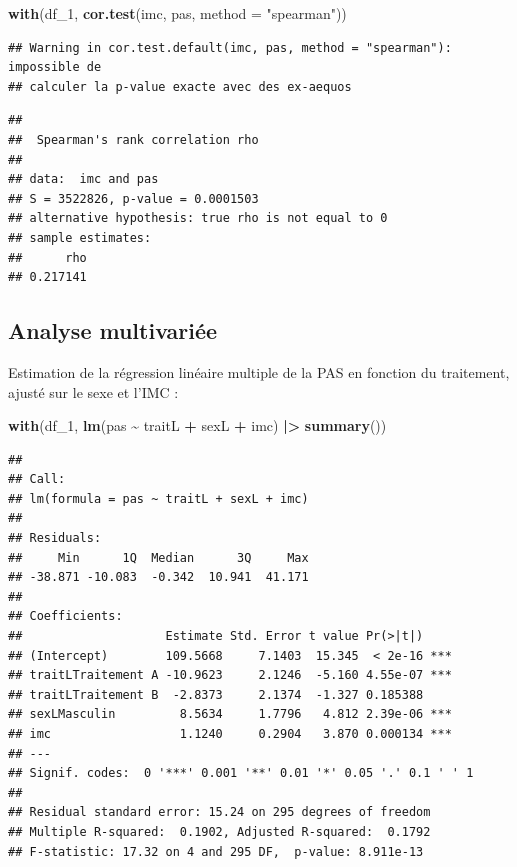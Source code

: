 \documentclass[
]{book}
\newenvironment{Shaded}{\begin{snugshade}}{\end{snugshade}}
\newcommand{\AttributeTok}[1]{\textcolor[rgb]{0.13,0.29,0.53}{#1}}
\newcommand{\FunctionTok}[1]{\textcolor[rgb]{0.13,0.29,0.53}{\textbf{#1}}}
\newcommand{\NormalTok}[1]{#1}
\newcommand{\SpecialCharTok}[1]{\textcolor[rgb]{0.81,0.36,0.00}{\textbf{#1}}}
\newcommand{\StringTok}[1]{\textcolor[rgb]{0.31,0.60,0.02}{#1}}
\begin{document}
\begin{Shaded}
\begin{Highlighting}[]
\FunctionTok{with}\NormalTok{(df\_1,}
     \FunctionTok{cor.test}\NormalTok{(imc, pas, }\AttributeTok{method =} \StringTok{"spearman"}\NormalTok{))}
\end{Highlighting}
\end{Shaded}

\begin{verbatim}
## Warning in cor.test.default(imc, pas, method = "spearman"): impossible de
## calculer la p-value exacte avec des ex-aequos
\end{verbatim}

\begin{verbatim}
## 
##  Spearman's rank correlation rho
## 
## data:  imc and pas
## S = 3522826, p-value = 0.0001503
## alternative hypothesis: true rho is not equal to 0
## sample estimates:
##      rho 
## 0.217141
\end{verbatim}

\subsection{Analyse multivariée}\label{analyse-multivariuxe9e-1}

Estimation de la régression linéaire multiple de la PAS en fonction du traitement, ajusté sur le sexe et l'IMC :

\begin{Shaded}
\begin{Highlighting}[]
\FunctionTok{with}\NormalTok{(df\_1,}
     \FunctionTok{lm}\NormalTok{(pas }\SpecialCharTok{\textasciitilde{}}\NormalTok{ traitL }\SpecialCharTok{+}\NormalTok{ sexL }\SpecialCharTok{+}\NormalTok{ imc) }\SpecialCharTok{|\textgreater{}}
       \FunctionTok{summary}\NormalTok{())}
\end{Highlighting}
\end{Shaded}

\begin{verbatim}
## 
## Call:
## lm(formula = pas ~ traitL + sexL + imc)
## 
## Residuals:
##     Min      1Q  Median      3Q     Max 
## -38.871 -10.083  -0.342  10.941  41.171 
## 
## Coefficients:
##                    Estimate Std. Error t value Pr(>|t|)    
## (Intercept)        109.5668     7.1403  15.345  < 2e-16 ***
## traitLTraitement A -10.9623     2.1246  -5.160 4.55e-07 ***
## traitLTraitement B  -2.8373     2.1374  -1.327 0.185388    
## sexLMasculin         8.5634     1.7796   4.812 2.39e-06 ***
## imc                  1.1240     0.2904   3.870 0.000134 ***
## ---
## Signif. codes:  0 '***' 0.001 '**' 0.01 '*' 0.05 '.' 0.1 ' ' 1
## 
## Residual standard error: 15.24 on 295 degrees of freedom
## Multiple R-squared:  0.1902, Adjusted R-squared:  0.1792 
## F-statistic: 17.32 on 4 and 295 DF,  p-value: 8.911e-13
\end{verbatim}
\end{document}
